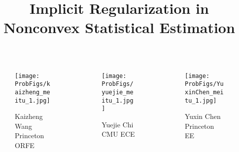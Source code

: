 \documentclass[compress,
mathserif,wide,%
]{beamer}
\title %
[]{{ Implicit Regularization in \\Nonconvex Statistical Estimation}}
\newcommand{\ProbFigs}{figure}
\begin{document}
\begin{frame}[plain]
  \titlepage

\end{frame}



\begin{frame}[plain]

\begin{columns}


\begin{column}{0.3\textwidth}
\begin{figure}
	{\texttt{[image: \\ProbFigs/kaizheng\_meitu\_1.jpg]}}
	\captionsetup{justification=centering}
	\caption*{Kaizheng Wang \\Princeton ORFE}
\end{figure}
\end{column}

\begin{column}{0.3\textwidth}
\begin{figure}
	{\texttt{[image: \\ProbFigs/yuejie\_meitu\_1.jpg]}}
	\captionsetup{justification=centering}
	\caption*{Yuejie Chi \\ CMU ECE}
\end{figure}
\end{column}

\begin{column}{0.3\textwidth}
\begin{figure}
	{\texttt{[image: \\ProbFigs/YuxinChen\_meitu\_1.jpg]}}
	\captionsetup{justification=centering}
	\caption*{Yuxin Chen\\ Princeton EE}
\end{figure}
\end{column}

\end{columns}
\end{frame}
\end{document}
